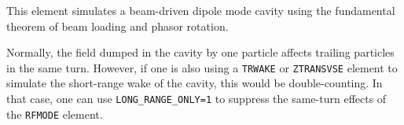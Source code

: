 This element simulates a beam-driven dipole mode cavity using the fundamental theorem of beam loading and phasor rotation.

Normally, the field dumped in the cavity by one particle affects trailing particles in the same turn.
However, if one is also using a \verb|TRWAKE| or \verb|ZTRANSVSE| element to simulate the short-range wake of the cavity, this would be double-counting.
In that case, one can use \verb|LONG_RANGE_ONLY=1| to suppress the same-turn effects of the \verb|RFMODE| element.
